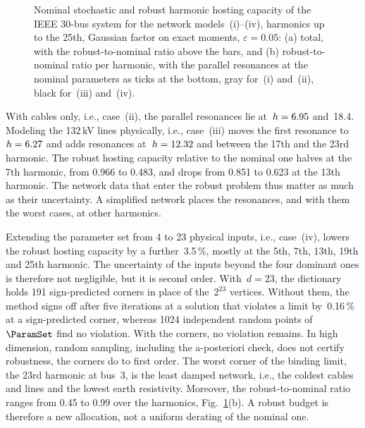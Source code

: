 \begin{figure}[!b]
{}
    \caption{Nominal stochastic and robust harmonic hosting capacity of the IEEE 30-bus system for the network models~(i)--(iv), harmonics up to the 25th, Gaussian factor on exact moments, $\varepsilon = 0.05$: (a) total, with the robust-to-nominal ratio above the bars, and (b) robust-to-nominal ratio per harmonic, with the parallel resonances at the nominal parameters as ticks at the bottom, gray for~(i) and~(ii), black for~(iii) and~(iv).}
    \label{fig:ieee30_physical}
\end{figure}

With cables only, i.e., case~(ii), the parallel resonances lie at~$h = 6.95$ and~18.4. Modeling the 132\,kV lines physically, i.e., case~(iii) moves the first resonance to~$h = 6.27$ and adds resonances at~$h = 12.32$ and between the 17th and the 23rd harmonic. The robust hosting capacity relative to the nominal one halves at the 7th harmonic, from 0.966 to 0.483, and drops from 0.851 to 0.623 at the 13th harmonic. The network data that enter the robust problem thus matter as much as their uncertainty. A simplified network places the resonances, and with them the worst cases, at other harmonics.

Extending the parameter set from 4 to 23 physical inputs, i.e., case~(iv), lowers the robust hosting capacity by a further~3.5\,\%, mostly at the 5th, 7th, 13th, 19th and 25th harmonic. The uncertainty of the inputs beyond the four dominant ones is therefore not negligible, but it is second order. With~$d = 23$, the dictionary holds 191 sign-predicted corners in place of the~$2^{23}$ vertices. Without them, the method signs off after five iterations at a solution that violates a limit by~0.16\,\% at a sign-predicted corner, whereas 1024 independent random points of~$\ParamSet$ find no violation. With the corners, no violation remains. In high dimension, random sampling, including the a-posteriori check, does not certify robustness, the corners do to first order. The worst corner of the binding limit, the 23rd harmonic at bus~3, is the least damped network, i.e., the coldest cables and lines and the lowest earth resistivity. Moreover, the robust-to-nominal ratio ranges from 0.45 to 0.99 over the harmonics, Fig.~\ref{fig:ieee30_physical}(b). A robust budget is therefore a new allocation, not a uniform derating of the nominal one.

